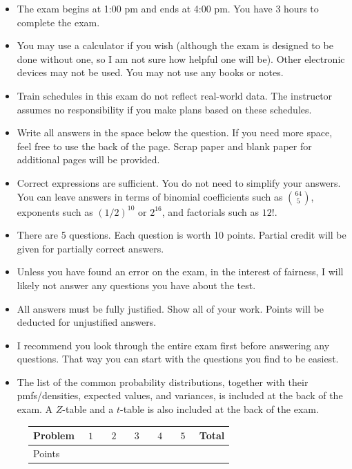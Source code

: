 \documentclass[12pt]{article}
\begin{document}
\begin{itemize}
\item The exam begins at 1:00 pm and ends at 4:00 pm. You have 3 hours to complete the exam.
\item You may use a calculator if you wish (although the exam is designed to be done without one, so I am not sure how helpful one will be). Other electronic devices may not be used. You may not use any books or notes. 
\item Train schedules in this exam do not reflect real-world data. The instructor assumes no responsibility if you make plans based on these schedules.
\item Write all answers in the space below the question. If you need more space, feel free to use the back of the page. Scrap paper and blank paper for additional pages will be provided.
\item Correct expressions are sufficient. You do not need to simplify your answers. You can leave answers in terms of binomial coefficients such as $\binom{64}{5}$, exponents such as $(1/2)^{10}$ or $2^{16}$, and factorials such as $12!$.
\item There are 5 questions. Each question is worth 10 points. Partial credit will be given for partially correct answers.
\item Unless you have found an error on the exam, in the interest of fairness, I will likely not answer any questions you have about the test.
\item All answers must be fully justified. Show all of your work. Points will be deducted for unjustified answers.
\item I recommend you look through the entire exam first before answering any questions. That way you can start with the questions you find to be easiest.
\item The list of the common probability distributions, together with their pmfs/densities, expected values, and variances, is included at the back of the exam. A $Z$-table and a $t$-table is also included at the back of the exam.
\end{itemize}

\begin{figure}[H]
\centering
\label{my-label}
\begin{tabular}{|l|l|l|l|l|l|l|}
\hline
Problem & $\:\:1\:\:$ & $\:\:2\:\:$ & $\:\:3\:\:$ & $\:\:4\:\:$ & $\:\:5\:\:$ & Total \\ \hline
Points  &   &   &   &   &   &       \\ \hline
\end{tabular}
\end{figure}
\end{document}
